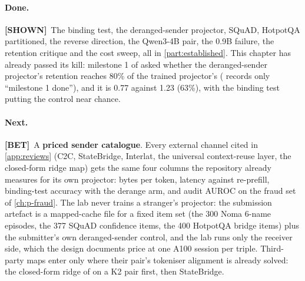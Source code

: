 \documentclass[11pt,a4paper]{report}
\newcommand{\SHOWN}{\textcolor{shownc}{\textbf{\scriptsize[SHOWN]}}}
\newcommand{\BET}{\textcolor{betc}{\textbf{\scriptsize[BET]}}}
\begin{document}
\paragraph{Done.} \SHOWN\ The binding test, the deranged-sender projector, SQuAD, HotpotQA partitioned, the reverse direction, the Qwen3-4B pair, the 0.9B failure, the retention critique and the cost sweep, all in \cref{part:established}. This chapter has already passed its kill: milestone 1 of  asked whether the deranged-sender projector's retention reaches 80\% of the trained projector's ( records only ``milestone 1 done''), and it is 0.77 against 1.23 (63\%), with the binding test putting the control near chance.

\paragraph{Next.} \BET\ A \textbf{priced sender catalogue}. Every external channel cited in \cref{app:reviews} (C2C, StateBridge, Interlat, the universal context-reuse layer, the closed-form ridge map) gets the same four columns the repository already measures for its own projector: bytes per token, latency against re-prefill, binding-test accuracy with the derange arm, and audit AUROC on the fraud set of \cref{ch:p-fraud}. The lab never trains a stranger's projector: the submission artefact is a mapped-cache file for a fixed item set (the 300 Noma 6-name episodes, the 377 SQuAD confidence items, the 400 HotpotQA bridge items) plus the submitter's own deranged-sender control, and the lab runs only the receiver side, which the design documents price at one A100 session per triple. Third-party maps enter only where their pair's tokeniser alignment is already solved: the closed-form ridge of \citet{2608.03893} on a K2 pair first, then StateBridge.
\end{document}
